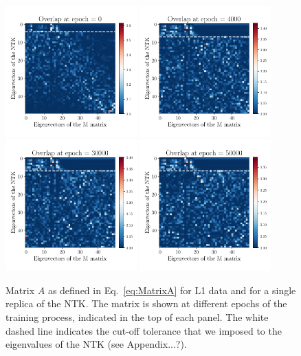 \begin{figure}[h!]
  \centering
  \includegraphics[width=0.45\textwidth]{plots/overlap_epoch_0.pdf}
  \includegraphics[width=0.45\textwidth]{plots/overlap_epoch_4000.pdf} \\[-15pt]
  \includegraphics[width=0.45\textwidth]{plots/overlap_epoch_30000.pdf}
  \includegraphics[width=0.45\textwidth]{plots/overlap_epoch_50000.pdf}
  \vspace{0.5cm}
  \caption{Matrix $A$ as defined in Eq.~\eqref{eq:MatrixA} for L1 data and for a
  single replica of the NTK. The matrix is shown at different epochs of the
  training process, indicated in the top of each panel. The white dashed line
  indicates the cut-off tolerance that we imposed to the eigenvalues of the NTK
  (see Appendix...?).}
  \label{fig:NtkMAlign}
\end{figure}
